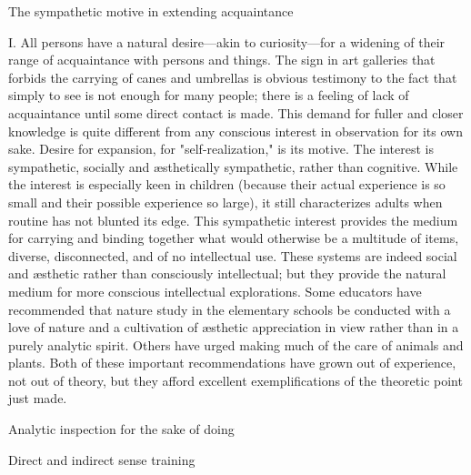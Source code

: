 \documentclass[letterpaper]{book}
\begin{document}
The sympathetic motive in extending acquaintance

I. All persons have a natural desire---akin to curiosity---for a
widening of their range of acquaintance with persons and things. The
sign in art galleries that forbids the carrying of canes and umbrellas
is obvious testimony to the fact that simply to see is not enough for
many people; there is a feeling of lack of acquaintance until some
direct contact is made. This demand for fuller and closer knowledge is
quite different from any conscious interest in observation for its own
sake. Desire for expansion, for "self-realization," is its motive. The
interest is sympathetic, socially and æsthetically sympathetic, rather
than cognitive. While the interest is especially keen in children
(because their actual experience is so small and their possible
experience so large), it still characterizes adults when routine has not
blunted its edge. This sympathetic interest provides the medium for
carrying and binding together what would otherwise be a multitude of
items, diverse, disconnected, and of no intellectual use. These systems
are indeed social and æsthetic rather than consciously
intellectual;
but they provide the natural medium for more conscious intellectual
explorations. Some educators have recommended that nature study in the
elementary schools be conducted with a love of nature and a cultivation
of æsthetic appreciation in view rather than in a purely analytic
spirit. Others have urged making much of the care of animals and plants.
Both of these important recommendations have grown out of experience,
not out of theory, but they afford excellent exemplifications of the
theoretic point just made.

Analytic inspection for the sake of doing

Direct and indirect sense training
\end{document}
